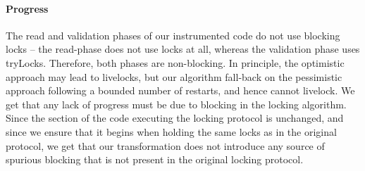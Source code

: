 \paragraph{Progress}
The read and validation phases of our instrumented code do not use blocking locks -- the read-phase does not use locks at all, whereas the 
validation phase uses tryLocks. Therefore, both phases are non-blocking. In principle, the optimistic approach may lead to livelocks, but 
our algorithm fall-back on the pessimistic approach following a bounded number of restarts, and hence cannot livelock. We get that any lack
of progress must be due to blocking in the locking algorithm. Since the section of the code executing the locking protocol is unchanged, and
since we ensure that it begins when holding the same locks as in the original protocol, we get that our transformation does not introduce any
source of spurious blocking that is not present in the original locking protocol. 


